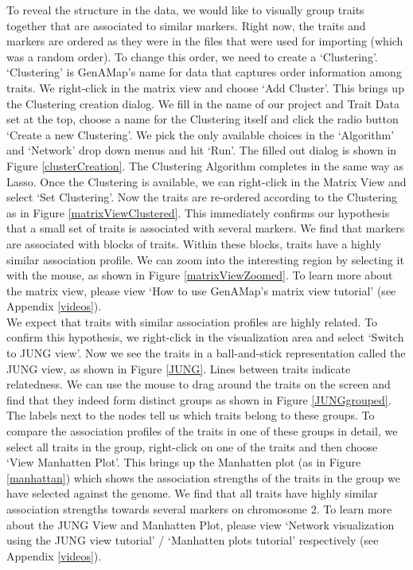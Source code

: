 \documentclass{article}
\begin{document}
To reveal the structure in the data, we would like to visually group traits together that are associated to similar markers. Right now, the traits and markers are ordered as they were in the files that were used for importing (which was a random order). To change this order, we need to create a `Clustering'. `Clustering' is GenAMap's name for data that captures order information among traits. We right-click in the matrix view and choose `Add Cluster'. This brings up the Clustering creation dialog. We fill in the name of our project and Trait Data set at the top, choose a name for the Clustering itself and click the radio button `Create a new Clustering'. We pick the only available choices in the `Algorithm' and `Network' drop down menus and hit `Run'. The filled out dialog is shown in Figure \ref{clusterCreation}. The Clustering Algorithm completes in the same way as Lasso. Once the Clustering is available, we can right-click in the Matrix View and select `Set Clustering'. Now the traits are re-ordered according to the Clustering as in Figure \ref{matrixViewClustered}. This immediately confirms our hypothesis that a small set of traits is associated with several markers. We find that markers are associated with blocks of traits. Within these blocks, traits have a highly similar association profile. We can zoom into the interesting region by selecting it with the mouse, as shown in Figure \ref{matrixViewZoomed}. To learn more about the matrix view, please view `How to use GenAMap's matrix view tutorial' (see Appendix \ref{videos}).\\

We expect that traits with similar association profiles are highly related. To confirm this hypothesis, we right-click in the visualization area and select `Switch to JUNG view'. Now we see the traits in a ball-and-stick representation called the JUNG view, as shown in Figure \ref{JUNG}. Lines between traits indicate relatedness. We can use the mouse to drag around the traits on the screen and find that they indeed form distinct groups as shown in Figure \ref{JUNGgrouped}. The labels next to the nodes tell us which traits belong to these groups. To compare the association profiles of the traits in one of these groups in detail, we select all traits in the group, right-click on one of the traits and then choose `View Manhatten Plot'. This brings up the Manhatten plot (as in Figure \ref{manhattan}) which shows the association strengths of the traits in the group we have selected against the genome. We find that all traits have highly similar association strengths towards several markers on chromosome 2. To learn more about the JUNG View and Manhatten Plot, please view `Network visualization using the JUNG view tutorial' / `Manhatten plots tutorial' respectively (see Appendix \ref{videos}). \\
\end{document}
